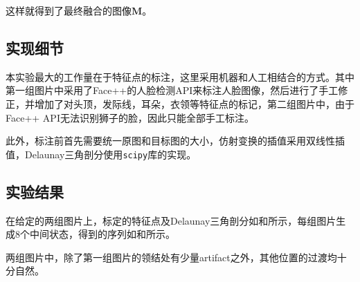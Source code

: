 \documentclass[12pt,a4paper]{article}
\begin{document}
这样就得到了最终融合的图像$\mathbf{M}$。

\subsection{实现细节}

本实验最大的工作量在于特征点的标注，这里采用机器和人工相结合的方式。其中第一组图片中采用了Face++的人脸检测API来标注人脸图像，然后进行了手工修正，并增加了对头顶，发际线，耳朵，衣领等特征点的标记，第二组图片中，由于Face++ API无法识别狮子的脸，因此只能全部手工标注。

此外，标注前首先需要统一原图和目标图的大小，仿射变换的插值采用双线性插值，Delaunay三角剖分使用\texttt{scipy}库的实现。

\subsection{实验结果}

在给定的两组图片上，标定的特征点及Delaunay三角剖分如和所示，每组图片生成8个中间状态，得到的序列如和所示。

两组图片中，除了第一组图片的领结处有少量artifact之外，其他位置的过渡均十分自然。
\end{document}
